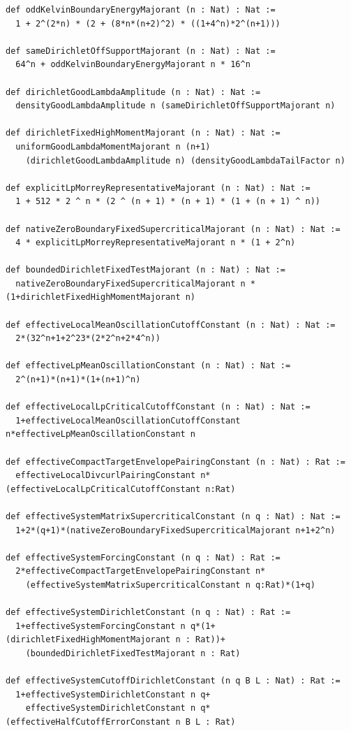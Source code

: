 \documentclass[11pt,a4paper]{article}
\numberwithin{equation}{section}
\theoremstyle{definition}
\theoremstyle{remark}
\begin{document}
\begin{lstlisting}
def oddKelvinBoundaryEnergyMajorant (n : Nat) : Nat :=
  1 + 2^(2*n) * (2 + (8*n*(n+2)^2) * ((1+4^n)*2^(n+1)))

def sameDirichletOffSupportMajorant (n : Nat) : Nat :=
  64^n + oddKelvinBoundaryEnergyMajorant n * 16^n

def dirichletGoodLambdaAmplitude (n : Nat) : Nat :=
  densityGoodLambdaAmplitude n (sameDirichletOffSupportMajorant n)

def dirichletFixedHighMomentMajorant (n : Nat) : Nat :=
  uniformGoodLambdaMomentMajorant n (n+1)
    (dirichletGoodLambdaAmplitude n) (densityGoodLambdaTailFactor n)

def explicitLpMorreyRepresentativeMajorant (n : Nat) : Nat :=
  1 + 512 * 2 ^ n * (2 ^ (n + 1) * (n + 1) * (1 + (n + 1) ^ n))

def nativeZeroBoundaryFixedSupercriticalMajorant (n : Nat) : Nat :=
  4 * explicitLpMorreyRepresentativeMajorant n * (1 + 2^n)

def boundedDirichletFixedTestMajorant (n : Nat) : Nat :=
  nativeZeroBoundaryFixedSupercriticalMajorant n * (1+dirichletFixedHighMomentMajorant n)

def effectiveLocalMeanOscillationCutoffConstant (n : Nat) : Nat :=
  2*(32^n+1+2^23*(2*2^n+2*4^n))

def effectiveLpMeanOscillationConstant (n : Nat) : Nat :=
  2^(n+1)*(n+1)*(1+(n+1)^n)

def effectiveLocalLpCriticalCutoffConstant (n : Nat) : Nat :=
  1+effectiveLocalMeanOscillationCutoffConstant n*effectiveLpMeanOscillationConstant n

def effectiveCompactTargetEnvelopePairingConstant (n : Nat) : Rat :=
  effectiveLocalDivcurlPairingConstant n*(effectiveLocalLpCriticalCutoffConstant n:Rat)

def effectiveSystemMatrixSupercriticalConstant (n q : Nat) : Nat :=
  1+2*(q+1)*(nativeZeroBoundaryFixedSupercriticalMajorant n+1+2^n)

def effectiveSystemForcingConstant (n q : Nat) : Rat :=
  2*effectiveCompactTargetEnvelopePairingConstant n*
    (effectiveSystemMatrixSupercriticalConstant n q:Rat)*(1+q)

def effectiveSystemDirichletConstant (n q : Nat) : Rat :=
  1+effectiveSystemForcingConstant n q*(1+(dirichletFixedHighMomentMajorant n : Rat))+
    (boundedDirichletFixedTestMajorant n : Rat)

def effectiveSystemCutoffDirichletConstant (n q B L : Nat) : Rat :=
  1+effectiveSystemDirichletConstant n q+
    effectiveSystemDirichletConstant n q*(effectiveHalfCutoffErrorConstant n B L : Rat)


\end{lstlisting}
\end{document}
